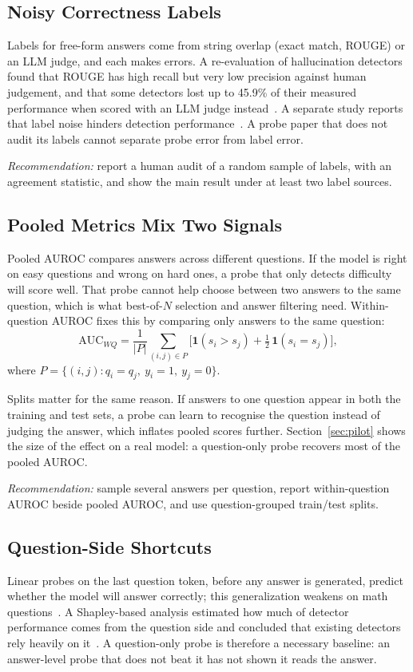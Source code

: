 \documentclass[conference]{IEEEtran}
\begin{document}
\subsection{Noisy Correctness Labels}
Labels for free-form answers come from string overlap (exact match, ROUGE) or an LLM judge, and each makes errors. A re-evaluation of hallucination detectors found that ROUGE has high recall but very low precision against human judgement, and that some detectors lost up to 45.9\% of their measured performance when scored with an LLM judge instead~\cite{illusion2025}. A separate study reports that label noise hinders detection performance~\cite{rethinking2026}. A probe paper that does not audit its labels cannot separate probe error from label error.

\textit{Recommendation:} report a human audit of a random sample of labels, with an agreement statistic, and show the main result under at least two label sources.

\subsection{Pooled Metrics Mix Two Signals}
\label{sec:pooled}
Pooled AUROC compares answers across different questions. If the model is right on easy questions and wrong on hard ones, a probe that only detects difficulty will score well. That probe cannot help choose between two answers to the same question, which is what best-of-$N$ selection and answer filtering need. Within-question AUROC fixes this by comparing only answers to the same question:
\begin{equation}
\mathrm{AUC}_{WQ} = \frac{1}{|P|} \sum_{(i,j) \in P} \Big[ \mathbf{1}(s_i > s_j) + \tfrac{1}{2}\,\mathbf{1}(s_i = s_j) \Big],
\label{eq:wq}
\end{equation}
where $P = \{(i,j): q_i = q_j,\ y_i = 1,\ y_j = 0\}$.

Splits matter for the same reason. If answers to one question appear in both the training and test sets, a probe can learn to recognise the question instead of judging the answer, which inflates pooled scores further. Section~\ref{sec:pilot} shows the size of the effect on a real model: a question-only probe recovers most of the pooled AUROC.

\textit{Recommendation:} sample several answers per question, report within-question AUROC beside pooled AUROC, and use question-grouped train/test splits.

\subsection{Question-Side Shortcuts}
Linear probes on the last question token, before any answer is generated, predict whether the model will answer correctly; this generalization weakens on math questions~\cite{cencerrado2025noanswer}. A Shapley-based analysis estimated how much of detector performance comes from the question side and concluded that existing detectors rely heavily on it~\cite{seo2025aqe}. A question-only probe is therefore a necessary baseline: an answer-level probe that does not beat it has not shown it reads the answer.
\end{document}
